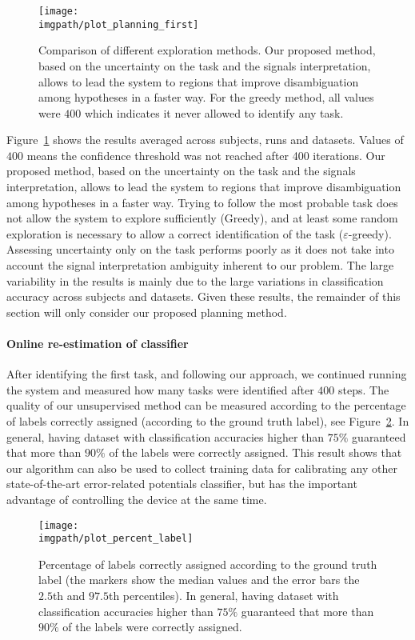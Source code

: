 \begin{figure}[!ht]
    \centering
    \texttt{[image: \\imgpath/plot\_planning\_first]}
    \caption{Comparison of different exploration methods. Our proposed method, based on the uncertainty on the task and the signals interpretation, allows to lead the system to regions that improve disambiguation among hypotheses in a faster way. For the greedy method, all values were $400$ which indicates it never allowed to identify any task.}
    \label{fig:compplan}
\end{figure}

Figure~\ref{fig:compplan} shows the results averaged across subjects, runs and datasets. Values of $400$ means the confidence threshold was not reached after 400 iterations. Our proposed method, based on the uncertainty on the task and the signals interpretation, allows to lead the system to regions that improve disambiguation among hypotheses in a faster way. Trying to follow the most probable task does not allow the system to explore sufficiently (Greedy), and at least some random exploration is necessary to allow a correct identification of the task ($\varepsilon$-greedy). Assessing uncertainty only on the task performs poorly as it does not take into account the signal interpretation ambiguity inherent to our problem. The large variability in the results is mainly due to the large variations in classification accuracy across subjects and datasets. Given these results, the remainder of this section will only consider our proposed planning method.

\paragraph{Online re-estimation of classifier}
After identifying the first task, and following our approach, we continued running the system and measured how many tasks were identified after $400$ steps. The quality of our unsupervised method can be measured according to the percentage of labels correctly assigned (according to the ground truth label), see Figure~\ref{fig:percentageLabels}. In general, having dataset with classification accuracies higher than $75\%$ guaranteed that more than $90\%$ of the labels were correctly assigned. This result shows that our algorithm can also be used to collect training data for calibrating any other state-of-the-art error-related potentials classifier, but has the important advantage of controlling the device at the same time.

\begin{figure}[!ht]
    \centering
        \texttt{[image: \\imgpath/plot\_percent\_label]}
        \caption{Percentage of labels correctly assigned according to the ground truth label (the markers show the median values and the error bars the $2.5$th and $97.5$th percentiles). In general, having dataset with classification accuracies higher than $75\%$ guaranteed that more than $90\%$ of the labels were correctly assigned.}
        \label{fig:percentageLabels}
\end{figure}

